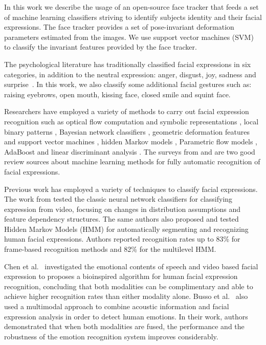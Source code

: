 \documentclass[]{article}
\begin{document}
In this work we describe the usage of an open-source face tracker that feeds a set of machine learning classifiers
striving to identify subjects identity and their facial expressions. The face tracker provides a set of pose-invariant
deformation parameters estimated from the images. We use support vector machines (SVM) to classify the invariant
features provided by the face tracker.


The psychological literature has traditionally classified facial expressions in six categories, in addition to the
neutral expression: anger, disgust, joy, sadness and surprise~\cite{schmidt2002human}. In this work, we also
classify some additional facial gestures such as: raising eyebrows, open mouth, kissing face, closed smile and squint
face.


Researchers have employed a variety of methods to carry out facial expression recognition such as optical flow
computation  and symbolic representations \cite{Yacoob506414}, local binary patterns \cite{Shan2009803},  Bayesian
network classifiers \cite{Cohen1211408}, geometric deformation features and support vector machines
\cite{kotsia4032815}, hidden Markov models \cite{aleksic1597130, Cohen2003160}, Parametric flow models
\cite{blackAndYacoob}, AdaBoost and linear discriminant analysis \cite{bartlett1398364}. The surveys from
\cite{bartlett1398364} and \cite{Fasel2003259} are two good review sources about machine learning methods 
for fully automatic recognition of facial expressions. 


Previous work has employed a variety of techniques to classify  facial expressions. The work from \cite{Cohen2003160}
tested the classic neural network classifiers for classifying expression from video, focusing on changes in distribution
assumptions and feature dependency structures. The same authors also proposed and tested Hidden Markov Models (HMM) for
automatically segmenting and recognizing human facial expressions. Authors reported recognition rates up to 83\% for
frame-based recognition methods and 82\% for the multilevel HMM.


Chen et al.~\cite{Chen670976} investigated the emotional contents of speech and video based facial expression to
proposes a bioinspired algorithm for human facial expression recognition, concluding that both modalities can be
complimentary and able to achieve higher recognition rates than either modality alone. Busso et al.~\cite{Busso:2004} also
used a multimodal approach to combine acoustic information and facial expression analysis in order to detect human
emotions. In their work, authors demonstrated that when both modalities are fused, the performance and the robustness of
the emotion recognition system improves considerably.
\end{document}
